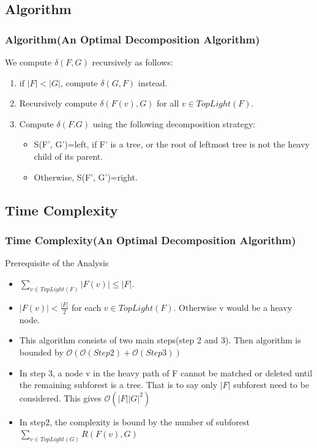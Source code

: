 \documentclass{beamer}
\begin{document}
\subsection{Algorithm}
\begin{frame}
\frametitle{Algorithm(An Optimal Decomposition Algorithm)}

We compute $\delta(F, G)$ recursively as follows:
\begin{enumerate}[(1)]
\item if $\left\vert F \right\vert < \left\vert G \right\vert$, compute $\delta(G, F)$ instead.
\item Recursively compute $\delta(F(v), G)$ for all $v \in TopLight(F)$.
\item Compute $\delta(F. G)$ using the following decomposition strategy:
\begin{itemize}
\item S(F', G')=left, if F' is a tree, or the root of leftmost tree is not the heavy child of its parent.
\item Otherwise, S(F', G')=right.
\end{itemize}
\end{enumerate}

\end{frame}

\subsection{Time Complexity}
\begin{frame}
\frametitle{Time Complexity(An Optimal Decomposition Algorithm)}
\begin{block}{Prerequisite of the Analysis}
\begin{itemize}
\item $\sum_{v \in TopLight(F)}\left\vert F(v) \right\vert \leq \left\vert F \right\vert$.
\item $\left\vert F(v) \right\vert < \frac{\left\vert F \right\vert}{2}$ for each $v \in TopLight(F)$. Otherwise v would be a heavy node.
\item This algorithm consists of two main steps(step 2 and 3). Then algorithm is bounded by $\mathcal{O}(\mathcal{O}(Step2) + \mathcal{O}(Step3))$
\item In step 3, a node v in the heavy path of F cannot be matched or deleted until the remaining subforest is a tree. That is to say only $\left\vert F \right\vert$ subforest need to be considered. This gives $\mathcal{O}(\left\vert F \right\vert \left\vert G \right\vert^ 2)$
\item In step2, the complexity is bound by the number of subforest $\sum_{v \in TopLight(G)}R(F(v), G)$
\end{itemize}

\end{block}
\end{frame}
\end{document}
